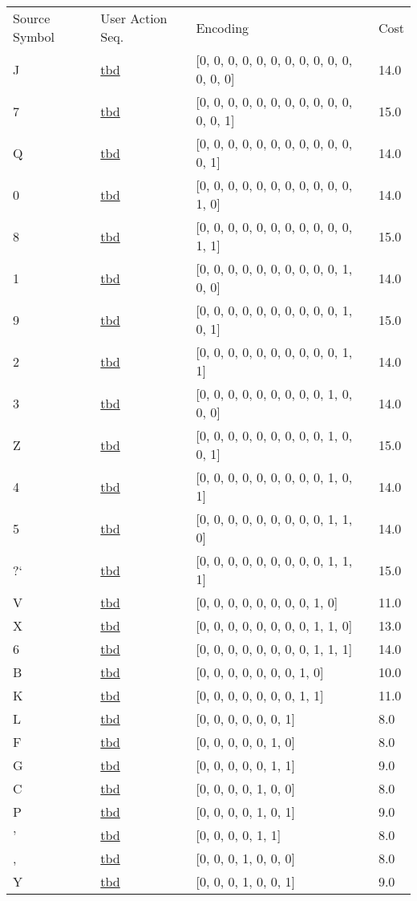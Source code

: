 \documentclass[12pt]{article}
\begin{document}
\begin{tabular}{l l l l}
Source Symbol	&	User Action Seq.	&	Encoding	&	Cost\\
J	&	\url{tbd}	&	[0, 0, 0, 0, 0, 0, 0, 0, 0, 0, 0, 0, 0, 0]	&	14.0\\
7	&	\url{tbd}	&	[0, 0, 0, 0, 0, 0, 0, 0, 0, 0, 0, 0, 0, 1]	&	15.0\\
Q	&	\url{tbd}	&	[0, 0, 0, 0, 0, 0, 0, 0, 0, 0, 0, 0, 1]	&	14.0\\
0	&	\url{tbd}	&	[0, 0, 0, 0, 0, 0, 0, 0, 0, 0, 0, 1, 0]	&	14.0\\
8	&	\url{tbd}	&	[0, 0, 0, 0, 0, 0, 0, 0, 0, 0, 0, 1, 1]	&	15.0\\
1	&	\url{tbd}	&	[0, 0, 0, 0, 0, 0, 0, 0, 0, 0, 1, 0, 0]	&	14.0\\
9	&	\url{tbd}	&	[0, 0, 0, 0, 0, 0, 0, 0, 0, 0, 1, 0, 1]	&	15.0\\
2	&	\url{tbd}	&	[0, 0, 0, 0, 0, 0, 0, 0, 0, 0, 1, 1]	&	14.0\\
3	&	\url{tbd}	&	[0, 0, 0, 0, 0, 0, 0, 0, 0, 1, 0, 0, 0]	&	14.0\\
Z	&	\url{tbd}	&	[0, 0, 0, 0, 0, 0, 0, 0, 0, 1, 0, 0, 1]	&	15.0\\
4	&	\url{tbd}	&	[0, 0, 0, 0, 0, 0, 0, 0, 0, 1, 0, 1]	&	14.0\\
5	&	\url{tbd}	&	[0, 0, 0, 0, 0, 0, 0, 0, 0, 1, 1, 0]	&	14.0\\
?`	&	\url{tbd}	&	[0, 0, 0, 0, 0, 0, 0, 0, 0, 1, 1, 1]	&	15.0\\
V	&	\url{tbd}	&	[0, 0, 0, 0, 0, 0, 0, 0, 1, 0]	&	11.0\\
X	&	\url{tbd}	&	[0, 0, 0, 0, 0, 0, 0, 0, 1, 1, 0]	&	13.0\\
6	&	\url{tbd}	&	[0, 0, 0, 0, 0, 0, 0, 0, 1, 1, 1]	&	14.0\\
B	&	\url{tbd}	&	[0, 0, 0, 0, 0, 0, 0, 1, 0]	&	10.0\\
K	&	\url{tbd}	&	[0, 0, 0, 0, 0, 0, 0, 1, 1]	&	11.0\\
L	&	\url{tbd}	&	[0, 0, 0, 0, 0, 0, 1]	&	8.0\\
F	&	\url{tbd}	&	[0, 0, 0, 0, 0, 1, 0]	&	8.0\\
G	&	\url{tbd}	&	[0, 0, 0, 0, 0, 1, 1]	&	9.0\\
C	&	\url{tbd}	&	[0, 0, 0, 0, 1, 0, 0]	&	8.0\\
P	&	\url{tbd}	&	[0, 0, 0, 0, 1, 0, 1]	&	9.0\\
'	&	\url{tbd}	&	[0, 0, 0, 0, 1, 1]	&	8.0\\
,	&	\url{tbd}	&	[0, 0, 0, 1, 0, 0, 0]	&	8.0\\
Y	&	\url{tbd}	&	[0, 0, 0, 1, 0, 0, 1]	&	9.0\\

\end{tabular}
\end{document}
